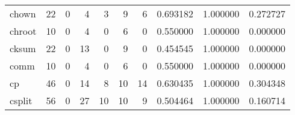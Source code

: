 \begin{tabular}{lrrrrrrrrr}
chown     &                                       22 &                                                  0 &                                                  4 &                                                  3 &                                                  9 &                                                  6 &                                           0.693182 &                               1.000000 &                             0.272727 \\
chroot    &                                       10 &                                                  0 &                                                  4 &                                                  0 &                                                  6 &                                                  0 &                                           0.550000 &                               1.000000 &                             0.000000 \\
cksum     &                                       22 &                                                  0 &                                                 13 &                                                  0 &                                                  9 &                                                  0 &                                           0.454545 &                               1.000000 &                             0.000000 \\
comm      &                                       10 &                                                  0 &                                                  4 &                                                  0 &                                                  6 &                                                  0 &                                           0.550000 &                               1.000000 &                             0.000000 \\
cp        &                                       46 &                                                  0 &                                                 14 &                                                  8 &                                                 10 &                                                 14 &                                           0.630435 &                               1.000000 &                             0.304348 \\
csplit    &                                       56 &                                                  0 &                                                 27 &                                                 10 &                                                 10 &                                                  9 &                                           0.504464 &                               1.000000 &                             0.160714 \\

\end{tabular}
